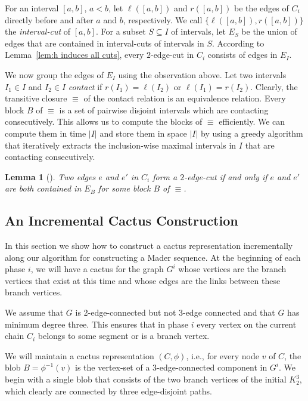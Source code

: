 \documentclass[paper=a4]{scrartcl}
\newtheorem{lemma}{Lemma}
\begin{document}
For an interval $[a,b]$, $a < b$, let $\ell([a,b])$ and $r([a,b])$ be the edges of $C_i$ directly before and after $a$ and $b$, respectively. We call $\{\ell([a,b]),r([a,b])\}$ the \emph{interval-cut} of $[a,b]$. For a subset $S \subseteq I$ of intervals, let $E_S$ be the union of edges that are contained in interval-cuts of intervals in $S$. According to Lemma~\ref{lem:h induces all cuts}, every $2$-edge-cut in $C_i$ consists of edges in $E_I$.

We now group the edges of $E_I$ using the observation above. Let two intervals $I_1 \in I$ and $I_2 \in I$ \emph{contact} if $r(I_1) = \ell(I_2)$ or $\ell(I_1) = r(I_2)$. Clearly, the transitive closure $\equiv$ of the contact relation is an equivalence relation. Every block $B$ of $\equiv$ is a set of pairwise disjoint intervals which are contacting consecutively.
This allows us to compute the blocks of $\equiv$ efficiently. We can compute them in time $|I|$ and store them in space $|I|$ by using a greedy algorithm that iteratively extracts the inclusion-wise maximal intervals in $I$ that are contacting consecutively. 


\begin{lemma}[\cite{Nagamochi1992a,Taoka1992,Tsin2009}]
Two edges $e$ and $e'$ in $C_i$ form a $2$-edge-cut if and only if $e$ and $e'$ are both contained in $E_B$ for some block $B$ of $\equiv$.
\end{lemma}










\subsection{An Incremental Cactus Construction}

In this section we show how to construct a cactus representation incrementally along our algorithm for constructing a Mader sequence. At the beginning of each phase $i$, we will have a cactus for the graph $G^i$ whose vertices are the branch vertices that exist at this time and whose edges are the links between these branch vertices.

We assume that $G$ is 2-edge-connected but not 3-edge connected and that $G$ has minimum degree three. This ensures that in phase $i$ every vertex on the current chain $C_i$ belongs to some segment or is a branch vertex.

We will maintain a cactus representation $(C,\phi)$, i.e., for every node $v$ of $C$, the blob $B = \phi^{-1}(v)$ is the vertex-set of a $3$-edge-connected component in $G^i$. We begin with a single blob that consists of the two branch vertices of the initial $K_2^3$, which clearly are connected by three edge-disjoint paths.
\end{document}
